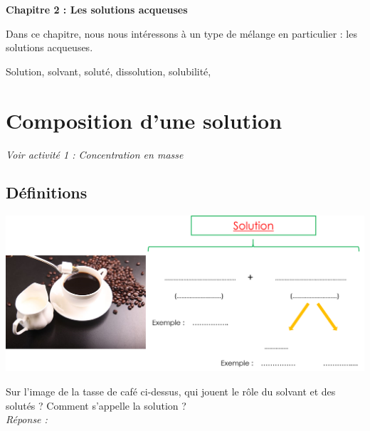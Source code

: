 \renewcommand{\thesubsection}{\textcolor{red}{\Roman{section}.\arabic{subsection}}}
\renewcommand{\thesubsubsection}{\textcolor{red}{\Roman{section}.\arabic{subsection}.\alph{subsubsection}}}

\setcounter{section}{0}
\sndEnTeteCoursDeux

\begin{mdframed}[style=titr, leftmargin=60pt, rightmargin=60pt, innertopmargin=7pt, innerbottommargin=7pt, innerrightmargin=8pt, innerleftmargin=8pt]

\begin{center}
\large{\textbf{Chapitre 2 : Les solutions acqueuses}}
\end{center}
\end{mdframed}
Dans ce chapitre, nous nous intéressons à un type de mélange en particulier : les solutions acqueuses.

\begin{tcolorbox}[colback=blue!5!white,colframe=blue!75!black,title=Mots clés du chapitre :]
Solution, solvant, soluté, dissolution, solubilité, 
\end{tcolorbox}


\section{Composition d'une solution}
\begin{Large}
\end{Large}\textit{Voir activité 1 : Concentration en masse}
\subsection{Définitions}
\begin{tcolorbox}[colback=green!5!white,colframe=green!75!black,title=\textbf{Solution, solvant, soluté}]
\begin{center}
    \includegraphics[width=\textwidth]{Images/Chapitre_2/Solution_def.png}
\end{center}
\end{tcolorbox}
Sur l'image de la tasse de café ci-dessus, qui jouent le rôle du solvant et des solutés ? Comment s'appelle la solution ?\\
\textit{Réponse :} \\

